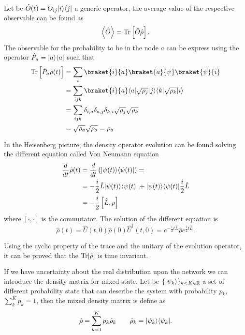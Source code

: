 Let be $\hat O(t) = O_{ij}\lvert i\rangle\langle j\rvert$ a generic operator, the average value of the respective observable can be found as
\begin{equation}
        \left< \hat O\right> = \operatorname{Tr}\left[\hat O\hat\rho\right].
\end{equation}
The observable for the probability to be in the node $a$ can be express using the operator $\hat P_a = \lvert a\rangle\langle a\rvert$ such that
\begin{equation} \label{state_projection_quantum}
    \begin{split}
        \Tr\left[\hat P_a\hat\rho(t)\right] &= \sum_i \braket{i}{a}\braket{a}{\psi}\braket{\psi}{i}\\
        & = \sum_{ijk} \braket{i}{a}\bra{a}\sqrt{\rho_j}\ket{j}\bra{k}\sqrt{\rho_k}\ket{i}\\
        &= \sum_{ijk} \delta_{i,a}\delta_{a,j}\delta_{k,i}\sqrt{\rho_j}\sqrt{\rho_k}\\
        & = \sqrt{\rho_a}\sqrt{\rho_a} = \rho_a
    \end{split}
\end{equation}

In the Heisenberg picture, the density operator evolution can be found solving the different equation called Von Neumann equation
\begin{equation}\label{Von Neumann equation}
    \begin{split}
        \frac{d}{dt}\hat\rho(t) &= \frac{d}{dt}\left(\lvert\psi(t)\rangle\langle\psi(t)\rvert\right) = \\
        &= -\frac{i}{2}\hat L\lvert\psi(t)\rangle\langle\psi(t)\rvert + \lvert\psi(t)\rangle\langle\psi(t)\rvert\frac{i}{2}\hat L\\
        &= -\frac{i}{2}\left[\hat L,\rho\right]
    \end{split}
\end{equation}
where $[\cdot,\cdot]$ is the commutator.
The solution of the different equation is
\begin{equation}
    \hat\rho(t) = \hat U(t,0)\hat\rho(0)\hat U^\dagger(t,0) = e^{-\frac{i}{2}t\hat L}\hat\rho e^{\frac{i}{2}t\hat L}.
\end{equation}

Using the cyclic property of the trace and the unitary of the evolution operator, it can be proved that the $\operatorname{Tr}[\hat\rho]$ is time invariant.

If we have uncertainty about the real distribution upon the network we can introduce the density matrix for mixed state. Let be $\{\lvert\psi_k\rangle\}_{k<K\in\mathbb{R}}$ a set of different probability state that can describe the system with probability $p_k$, $\sum_k^K p_k = 1$, then the mixed density matrix is define as
\begin{equation}
    \hat \rho = \sum_{k=1}^K p_k \hat \rho_k \qquad \hat\rho_k = \lvert\psi_k\rangle\langle\psi_k\rvert.
\end{equation}

